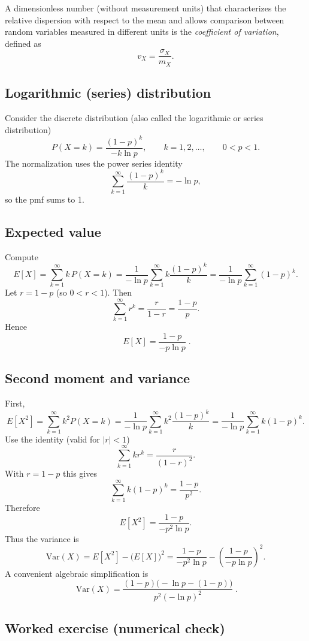\documentclass[12pt]{article}
\begin{document}
A dimensionless number (without measurement units) that characterizes the relative dispersion with respect to the mean and allows comparison between random variables measured in different units is the \textit{coefficient of variation}, defined as
\[
v_X = \frac{\sigma_X}{m_X}.
\]




\subsection{Logarithmic (series) distribution}
Consider the discrete distribution (also called the logarithmic or series distribution)
\[
P(X=k)=\frac{(1-p)^k}{-k\ln p},\qquad k=1,2,\dots,\qquad 0<p<1.
\]
The normalization uses the power series identity
\[
\sum_{k=1}^{\infty}\frac{(1-p)^k}{k}=-\ln p,
\]
so the pmf sums to 1.

\subsection{Expected value}

Compute
\[
E[X]=\sum_{k=1}^{\infty} k\,P(X=k)
      =\frac{1}{-\ln p}\sum_{k=1}^{\infty} k\frac{(1-p)^k}{k}
      =\frac{1}{-\ln p}\sum_{k=1}^{\infty}(1-p)^k.
\]
Let \(r=1-p\) (so \(0<r<1\)). Then
\[
\sum_{k=1}^{\infty} r^k=\frac{r}{1-r}=\frac{1-p}{p}.
\]
Hence
\[
\boxed{ \; E[X]=\frac{1-p}{-p\ln p} \; }.
\]

\subsection{Second moment and variance}

First,
\[
E[X^2]=\sum_{k=1}^{\infty} k^2 P(X=k)
      =\frac{1}{-\ln p}\sum_{k=1}^{\infty} k^2\frac{(1-p)^k}{k}
      =\frac{1}{-\ln p}\sum_{k=1}^{\infty} k(1-p)^k.
\]
Use the identity (valid for \(|r|<1\))
\[
\sum_{k=1}^{\infty} k r^k=\frac{r}{(1-r)^2}.
\]
With \(r=1-p\) this gives
\[
\sum_{k=1}^{\infty} k(1-p)^k=\frac{1-p}{p^2}.
\]
Therefore
\[
E[X^2]=\frac{1-p}{-p^2\ln p}.
\]
Thus the variance is
\[
\mathrm{Var}(X)=E[X^2]-\big(E[X]\big)^2
=\frac{1-p}{-p^2\ln p}-\left(\frac{1-p}{-p\ln p}\right)^{\!2}.
\]
A convenient algebraic simplification is
\[
\boxed{ \;
\mathrm{Var}(X)=\frac{(1-p)\big(-\ln p-(1-p)\big)}{p^2(-\ln p)^2}
\; }.
\]

\subsection{Worked exercise (numerical check)}
\end{document}
